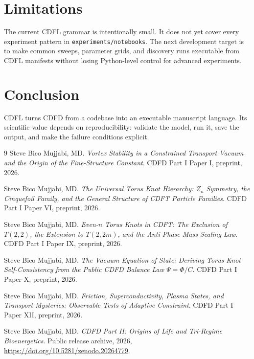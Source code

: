 \documentclass[12pt,a4paper]{article}
\begin{document}
\section{Limitations}
The current CDFL grammar is intentionally small. It does not yet cover every
experiment pattern in \texttt{experiments/notebooks}. The next development
target is to make common sweeps, parameter grids, and discovery runs executable
from CDFL manifests without losing Python-level control for advanced
experiments.

\section{Conclusion}
CDFL turns CDFD from a codebase into an executable manuscript language. Its
scientific value depends on reproducibility: validate the model, run it, save
the output, and make the failure conditions explicit.
\begin{thebibliography}{9}
Steve Bico Mujjabi, MD. \emph{Vortex Stability in a Constrained Transport Vacuum and the Origin of the Fine-Structure Constant}. CDFD Part I Paper I, preprint, 2026.

Steve Bico Mujjabi, MD. \emph{The Universal Torus Knot Hierarchy: $Z_n$ Symmetry, the Cinquefoil Family, and the General Structure of CDFT Particle Families}. CDFD Part I Paper VI, preprint, 2026.

Steve Bico Mujjabi, MD. \emph{Even-$n$ Torus Knots in CDFT: The Exclusion of $T(2,2)$, the Extension to $T(2,2m)$, and the Anti-Phase Mass Scaling Law}. CDFD Part I Paper IX, preprint, 2026.

Steve Bico Mujjabi, MD. \emph{The Vacuum Equation of State: Deriving Torus Knot Self-Consistency from the Public CDFD Balance Law $\Psi = \Phi/C$}. CDFD Part I Paper X, preprint, 2026.

Steve Bico Mujjabi, MD. \emph{Friction, Superconductivity, Plasma States, and Transport Mysteries: Observable Tests of Adaptive Constraint}. CDFD Part I Paper XII, preprint, 2026.

Steve Bico Mujjabi, MD. \emph{CDFD Part II: Origins of Life and Tri-Regime Bioenergetics}. Public release archive, 2026, \url{https://doi.org/10.5281/zenodo.20264779}.
\end{thebibliography}
\end{document}

